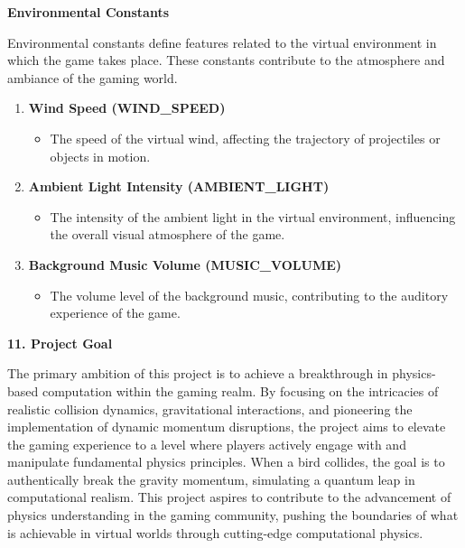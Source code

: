\documentclass[
]{article}
\begin{document}
\textbf{Environmental Constants}

Environmental constants define features related to the virtual
environment in which the game takes place. These constants contribute to
the atmosphere and ambiance of the gaming world.

\begin{enumerate}
\def\labelenumi{\arabic{enumi}.}
\item
  \textbf{Wind Speed (WIND\_SPEED)}

  \begin{itemize}
  \item
    The speed of the virtual wind, affecting the trajectory of
    projectiles or objects in motion.
  \end{itemize}
\item
  \textbf{Ambient Light Intensity (AMBIENT\_LIGHT)}

  \begin{itemize}
  \item
    The intensity of the ambient light in the virtual environment,
    influencing the overall visual atmosphere of the game.
  \end{itemize}
\item
  \textbf{Background Music Volume (MUSIC\_VOLUME)}

  \begin{itemize}
  \item
    The volume level of the background music, contributing to the
    auditory experience of the game.
  \end{itemize}
\end{enumerate}

\protect\hypertarget{qop}{}{}\textbf{11. Project Goal}

The primary ambition of this project is to achieve a breakthrough in
physics-based computation within the gaming realm. By focusing on the
intricacies of realistic collision dynamics, gravitational interactions,
and pioneering the implementation of dynamic momentum disruptions, the
project aims to elevate the gaming experience to a level where players
actively engage with and manipulate fundamental physics principles. When
a bird collides, the goal is to authentically break the gravity
momentum, simulating a quantum leap in computational realism. This
project aspires to contribute to the advancement of physics
understanding in the gaming community, pushing the boundaries of what is
achievable in virtual worlds through cutting-edge computational physics.
\end{document}
